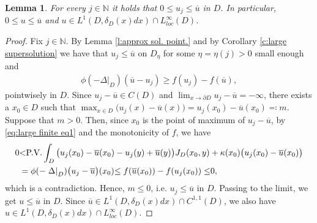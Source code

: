 \documentclass[12pt,a4paper,onecolumn]{amsart}
\newtheorem{lem}[thm]{Lemma}
\theoremstyle{definition}
\newcommand{\N}{\mathbb{N}}
\newcommand{\1}{\mathbf 1}
\newcommand{\LLL}{L^1(D,\de(x)dx)}
\newcommand{\Lo}{\phi(-\left.\Delta\right\vert_{D})}
\newcommand{\de}{\delta_D}
\numberwithin{equation}{section}
\begin{document}
\begin{lem}\label{l:large finite}
	For every $j\in \N$ it holds that $0\le u_j\le \overline u$ in $D$. In particular, $0\le u\le \overline u$ and $u\in \LLL\cap L^\infty_{loc}(D)$.
\end{lem}
\begin{proof}
Fix $j\in\N$. By Lemma \ref{l:approx sol. point.} and by Corollary \ref{c:large supersolution} we have that $u_j\le \overline u$ on $D_\eta$ for some $\eta =\eta(j)>0$ small enough and
\begin{align}\label{eq:large finite eq1}
	\Lo(\overline u - u_j)\ge f(u_j)-f(\overline u),
\end{align}
pointwisely in $D$. Since $u_j-\overline u\in C(D)$ and $\lim_{x\to \partial D} u_j-\overline u=-\infty$, there exists a $x_0\in D$ such that $\max_{x\in D}\big(u_j(x)-\overline u(x)\big)=u_j(x_0)-\overline u(x_0)\eqqcolon m$. Suppose that $m> 0$. Then, since $x_0$ is the point of maximum of $u_j-\overline u$, by \eqref{eq:large finite eq1} and the monotonicity of $f$, we have
\begin{align*}
	0&{<} \textrm{\textrm{P.V.}}\int_D\big(u_j(x_0)-\overline u(x_0)-u_j(y)+\overline u(y)\big)J_D(x_0,y)+\kappa(x_0)\big(u_j(x_0)-\overline u(x_0)\big)\\
	&=\Lo\big(u_j-\overline u\big)(x_0){\le  f(\overline u(x_0))-f(u_j(x_0))\le} 0,
\end{align*}
which is a contradiction. Hence, $m\le 0$, i.e. $u_j\le \overline u$ in $D$. {Passing} to the limit, we get $u\le \overline u$ in $D$. Since $\overline u\in \LLL \cap C^{1,1}(D)$, we also have $u\in \LLL \cap L^\infty_{loc}(D)$.
\end{proof}
\end{document}
